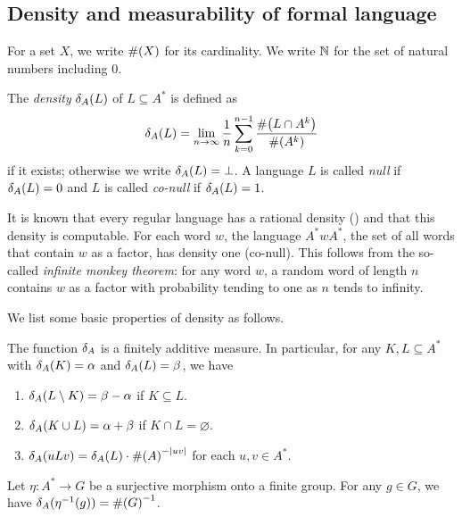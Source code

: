 \subsection{Density and measurability of formal language}
For a set $X$, we write $\#\!\left(X\right)$ for its cardinality.
We write $\mathbb{N}$ for the set of natural numbers including $0$.

\begin{definition}\upshape
The \emph{density} \(\delta_{A}(L)\) of \(L \subseteq A^*\) is defined as
\[
 \delta_{A}(L) = \lim_{n \rightarrow \infty} \frac{1}{n} \sum_{k = 0}^{n-1} \frac{\#\!\left(L \cap A^k\right)}{\#\!\left(A^k\right)}
\]
 if it exists; otherwise we write \(\delta_{A}(L) = \bot\).
 A language \(L\) is called \emph{null} if \(\delta_{A}(L) = 0\)
 and \(L\) is called \emph{co-null} if \(\delta_{A}(L) = 1\).
\end{definition}

\begin{example}\label{ex:density}
It is known that every regular language has a rational density (\cf \cite{codes}) and that this density is computable.
For each word \(w\), the language \(A^* w A^*\),
 the set of all words that contain \(w\) as a factor,
 has density one (\ie co-null). This follows from the so-called {\em infinite monkey theorem}:
for any word \(w\), a random word of length \(n\) contains \(w\) as a factor with probability tending to one as \(n\) tends to infinity.
\end{example}

We list some basic properties of density as follows.
\begin{lemma}\label{lem:density}
The function \(\delta_{A}\) is a finitely additive measure.
In particular, for any \(K, L \subseteq A^*\) with \(\delta_{A}(K) = \alpha\) and \(\delta_{A}(L) = \beta\), we have
\begin{enumerate}
\item \(\delta_{A}(L \setminus K) = \beta - \alpha\) if \(K \subseteq L\). 
\item \(\delta_{A}(K \cup L) = \alpha + \beta\) if \(K \cap L = \varnothing\). 
\item \(\delta_{A}(uLv) = \delta_{A}(L) \cdot \#\!\left(A\right)^{-|uv|}\) for each \(u, v \in A^*\).
\end{enumerate}
\end{lemma}
\begin{lemma}\label{lem:groupdensity}
 Let \(\eta\colon A^* \rightarrow G\) be a surjective morphism onto a finite group. For any \(g \in G\), we have \(\delta_{A}(\eta^{-1}(g)) = \#\!\left(G\right)^{-1}\).
\end{lemma}

